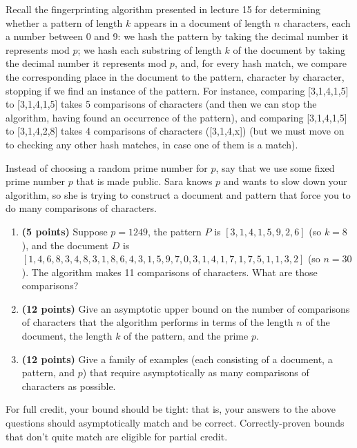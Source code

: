 \documentclass[11pt,letterpaper]{article}
\begin{document}
\pagebreak
\begin{problem}
    Recall the fingerprinting algorithm presented in lecture 15 for determining whether a pattern of length $k$ appears in a document of length $n$ characters, each a number between 0 and 9: we hash the pattern by taking the decimal number it represents mod $p$; we hash each substring of length $k$ of the document by taking the decimal number it represents mod $p$, and, for every hash match, we compare the corresponding place in the document to the pattern, character by character, stopping if we find an instance of the pattern. For instance, comparing [3,1,4,1,5] to [3,1,4,1,5] takes 5 comparisons of characters (and then we can stop the algorithm, having found an occurrence of the pattern), and comparing [3,1,4,1,5] to [3,1,4,2,8] takes 4 comparisons of characters ([3,1,4,x]) (but we must move on to checking any other hash matches, in case one of them is a match).
 
    Instead of choosing a random prime number for $p$, say that we use some fixed prime number $p$ that is made public. Sara knows $p$ and wants to slow down your algorithm, so she is trying to construct a document and pattern that force you to do many comparisons of characters.
    \begin{enumerate}
        \item {\bf (5 points)} Suppose $p = 1249$, the pattern $P$ is $[3,1,4,1,5,9,2,6]$ (so $k=8$), and the document $D$ is $[1,4,6,8,3,4,8,3,1,8,6,4,3,1,5,9,7,0,3,1,4,1,7,1,7,5,1,1,3,2]$ (so $n=30$). The algorithm makes 11 comparisons of characters. What are those comparisons? 
        \item {\bf (12 points)} Give an asymptotic upper bound on the number of comparisons of characters that the algorithm performs in terms of the length $n$ of the document, the length $k$ of the pattern, and the prime $p$. 
        \item {\bf (12 points)} Give a family of examples (each consisting of a document, a pattern, and $p$) that require asymptotically as many comparisons of characters as possible. 
    \end{enumerate}

    For full credit, your bound should be tight: that is, your answers to the above questions should asymptotically match and be correct. Correctly-proven bounds that don't quite match are eligible for partial credit.
\end{problem}
\end{document}
